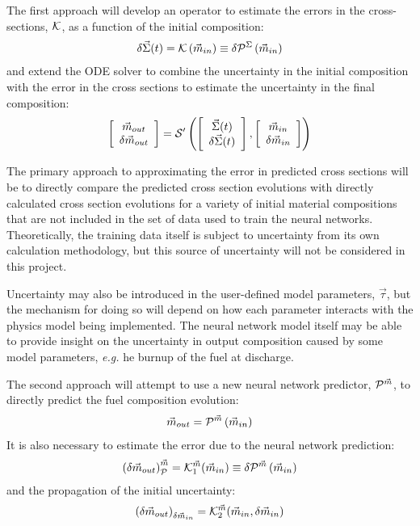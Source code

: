 \documentclass[dvips,11pt]{article}
\newcommand{\unc}[1]
{ \delta #1 }
\newcommand{\uncvector}[1]
{ \left[ \begin{array}{c} #1 \\ \delta #1 \end{array} \right] }
\begin{document}
The first approach will develop an operator to
estimate the errors in the cross-sections, 
${\cal K}$, as a function of the initial composition:
\begin{align}
  \delta\vec{\Sigma}(t)  = {\cal K}\left( \vec{m}_{in}\right)  \equiv  \unc{{\cal P}^\Sigma\left( \vec{m}_{in}\right)} \label{eq:NNSigmaError}
\end{align}
and extend the ODE solver to combine the
uncertainty in the initial composition with the
error in the cross sections to estimate the
uncertainty in the final composition:
\begin{align}
  \uncvector{\vec{m}_{out}} = {\cal S^\prime}\left( \uncvector{\vec{\Sigma}(t)}, \uncvector{\vec{m}_{in}}\right)
\end{align}

The primary approach to approximating the error in
predicted cross sections will be to directly
compare the predicted cross section evolutions
with directly calculated cross section evolutions
for a variety of initial material compositions that
are not included in the set of data used to train
the neural networks.  Theoretically, the training
data itself is subject to uncertainty from its own
calculation methodology, but this source of
uncertainty will not be considered in this
project.

Uncertainty may also be introduced in the
user-defined model parameters, $\vec{\tau}$, but the
mechanism for doing so will depend on how each
parameter interacts with the physics model being
implemented.  The neural network model itself may
be able to provide insight on the uncertainty in
output composition caused by some model
parameters, \textit{e.g.} he burnup of the fuel at
discharge.

The second approach will attempt to use a new
neural network predictor, ${\cal P}^{\vec{m}}$, to
directly predict the fuel composition evolution:
\begin{align} \vec{m}_{out} = {\cal P}^{\vec{m}}\left( \vec{m}_{in}\right)
\end{align}
It is also necessary to estimate the error due to
the neural network prediction:
\begin{align}
  \left(\unc{\vec{m}_{out}}\right)_{\cal P}^{\vec{m}}= {\cal K}_1^{{\vec{m}}}(\vec{m}_{in})  \equiv \unc{{\cal P}^{\vec{m}}\left( \vec{m}_{in}\right)} \label{eq:NNModError}
\end{align}
and the propagation of the initial uncertainty:
\begin{align}
  \left(\unc{\vec{m}_{out}}\right)_{\unc{\vec{m}_{in}}} = {\cal K}^{{\vec{m}}}_2(\vec{m}_{in}, \unc{\vec{m}_{in}})
\end{align}
\end{document}
